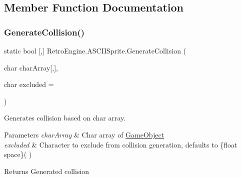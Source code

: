 \subsection{Member Function Documentation}
\mbox{\label{class_retro_engine_1_1_a_s_c_i_i_sprite_ae42023edb94d02b6f5c89314ba96c85c}} 
\subsubsection{\texorpdfstring{GenerateCollision()}{GenerateCollision()}\hspace{0.1cm}{\footnotesize\ttfamily [1/2]}}
{\footnotesize\ttfamily static bool \mbox{[},\mbox{]} Retro\+Engine.\+A\+S\+C\+I\+I\+Sprite.\+Generate\+Collision (\begin{DoxyParamCaption}\item[{char}]{char\+Array\mbox{[},\mbox{]},  }\item[{char}]{excluded = {\ttfamily \textquotesingle{}~\textquotesingle{}} }\end{DoxyParamCaption})\hspace{0.3cm}{\ttfamily [static]}}



Generates collision based on char array. 


\begin{DoxyParams}{Parameters}
{\em char\+Array} & Char array of \mbox{\hyperlink{class_retro_engine_1_1_game_object}{Game\+Object}}\\
\hline
{\em excluded} & Character to exclude from collision generation, defaults to \{float space\}(\textquotesingle{} \textquotesingle{})\\
\hline
\end{DoxyParams}
\begin{DoxyReturn}{Returns}
Generated collision
\end{DoxyReturn}
\mbox{\label{class_retro_engine_1_1_a_s_c_i_i_sprite_a3251ceca85408863040aafdc8802e09c}} 
